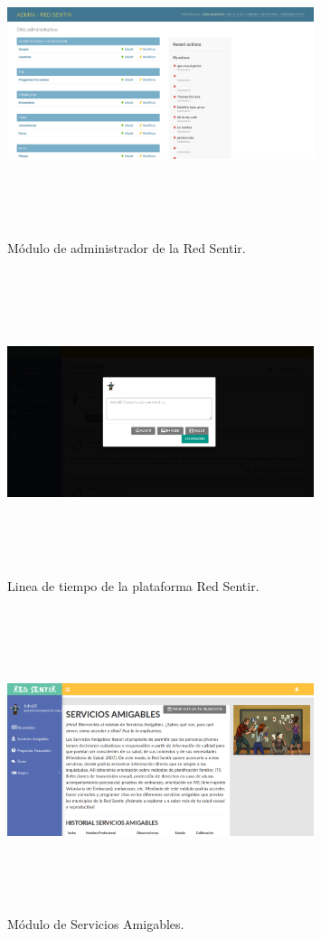 \documentclass[a4paper]{article}
\begin{document}
\begin{figure}[t]
\centering
\includegraphics[width=0.8\textwidth,height=3.5in]{admin.png}
\caption{Módulo de administrador de la Red Sentir.}
\label{fig:admin}
\end{figure}

\begin{figure}[t]
\centering
\includegraphics[width=0.8\textwidth,height=3.5in]{novedades.png}
\caption{Linea de tiempo de la plataforma Red Sentir.}
\label{fig:novedades}
\end{figure}

\begin{figure}[t]
\centering
\includegraphics[width=0.8\textwidth,height=3.5in]{SA.png}
\caption{Módulo de Servicios Amigables.}
\label{fig:SA}
\end{figure}
\end{document}
